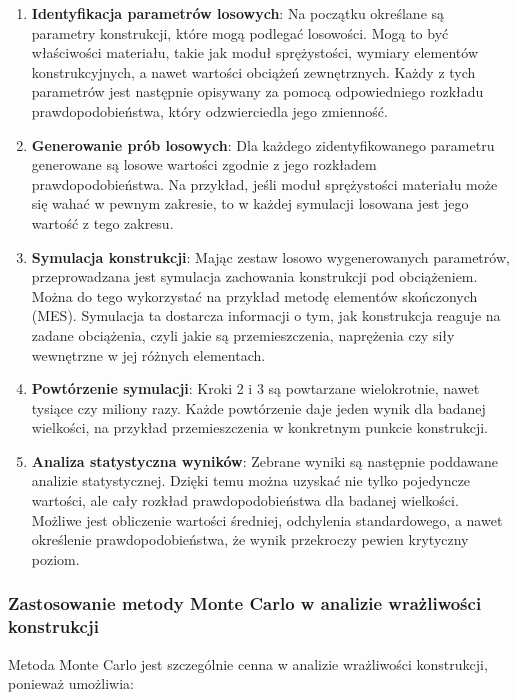 \begin{enumerate}
    \item \textbf{Identyfikacja parametrów losowych}: Na początku określane są parametry konstrukcji, które mogą podlegać losowości. Mogą to być właściwości materiału, takie jak moduł sprężystości, wymiary elementów konstrukcyjnych, a nawet wartości obciążeń zewnętrznych. Każdy z tych parametrów jest następnie opisywany za pomocą odpowiedniego rozkładu prawdopodobieństwa, który odzwierciedla jego zmienność.
    \item \textbf{Generowanie prób losowych}: Dla każdego zidentyfikowanego parametru generowane są losowe wartości zgodnie z jego rozkładem prawdopodobieństwa. Na przykład, jeśli moduł sprężystości materiału może się wahać w pewnym zakresie, to w każdej symulacji losowana jest jego wartość z tego zakresu.
    \item \textbf{Symulacja konstrukcji}: Mając zestaw losowo wygenerowanych parametrów, przeprowadzana jest symulacja zachowania konstrukcji pod obciążeniem. Można do tego wykorzystać na przykład metodę elementów skończonych (MES). Symulacja ta dostarcza informacji o tym, jak konstrukcja reaguje na zadane obciążenia, czyli jakie są przemieszczenia, naprężenia czy siły wewnętrzne w jej różnych elementach.
    \item \textbf{Powtórzenie symulacji}: Kroki 2 i 3 są powtarzane wielokrotnie, nawet tysiące czy miliony razy. Każde powtórzenie daje jeden wynik dla badanej wielkości, na przykład przemieszczenia w konkretnym punkcie konstrukcji.
    \item \textbf{Analiza statystyczna wyników}: Zebrane wyniki są następnie poddawane analizie statystycznej. Dzięki temu można uzyskać nie tylko pojedyncze wartości, ale cały rozkład prawdopodobieństwa dla badanej wielkości. Możliwe jest obliczenie wartości średniej, odchylenia standardowego, a nawet określenie prawdopodobieństwa, że wynik przekroczy pewien krytyczny poziom.
\end{enumerate}

\newpage
\subsubsection*{Zastosowanie metody Monte Carlo w analizie wrażliwości konstrukcji}
Metoda Monte Carlo jest szczególnie cenna w analizie wrażliwości konstrukcji, ponieważ umożliwia:

